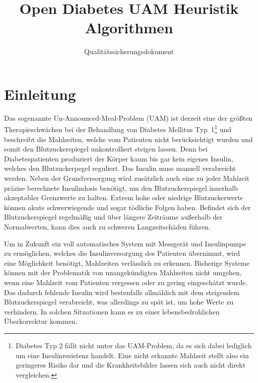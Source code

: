 \documentclass[accentcolor=tud0b,12pt,paper=a4]{tudreport}
\title{Open Diabetes UAM Heuristik Algorithmen}
\subtitle{Qualitätssicherungsdokument}
\begin{document}
	\maketitle
	\tableofcontents 
	
	\chapter{Einleitung}
Das sogenannte Un-Announced-Meal-Problem (UAM) ist derzeit eine der größten Therapieschwächen bei der Behandlung von Diabetes Mellitus \mbox{Typ 1}\footnote{Diabetes Typ 2 fällt nicht unter das UAM-Problem, da es sich dabei lediglich um eine Insulinresistenz handelt. Eine nicht erkannte Mahlzeit stellt also ein geringeres Risiko dar und die Krankheitsbilder lassen sich auch nicht direkt vergleichen.} und beschreibt die Mahlzeiten, welche vom Patienten nicht berücksichtigt wurden und somit den Blutzuckerspiegel unkontrolliert steigen lassen. Denn bei Diabetespatienten produziert der Körper kaum bis gar kein eigenes Insulin, welches den Blutzuckerpegel reguliert. Das Insulin muss manuell verabreicht werden. Neben der Grundversorgung wird zusätzlich auch eine zu jeder Mahlzeit präzise berechnete Insulindosis benötigt,  um den Blutzuckerspiegel innerhalb akzeptabler Grenzwerte zu halten. Extrem hohe oder niedrige Blutzuckerwerte können akute schwerwiegende und sogar tödliche Folgen haben. Befindet sich der Blutzuckerspiegel regelmäßig und über längere Zeiträume außerhalb der Normalwerten, kann dies auch zu schweren Langzeitschäden führen.

Um in Zukunft ein voll automatisches System mit Messgerät und Insulinpumpe zu ermöglichen, welches die Insulinversorgung des Patienten übernimmt, wird eine Möglichkeit benötigt, Mahlzeiten verlässlich zu erkennen. Bisherige Systeme können mit der Problematik von unangekündigten Mahlzeiten nicht umgehen, wenn eine Mahlzeit vom Patienten vergessen oder zu gering eingeschätzt wurde. Das dadurch fehlende Insulin wird bestenfalls allmählich mit dem steigendem Blutzuckerspiegel verabreicht, was allerdings zu spät ist, um hohe Werte zu verhindern. In solchen Situationen kann es zu einer lebensbedrohlichen Überkorrektur kommen.
\end{document}
